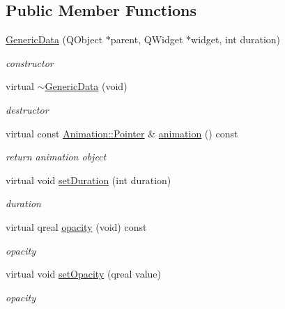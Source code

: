 \subsection*{Public Member Functions}
\begin{DoxyCompactItemize}
\item 
\mbox{\label{class_generic_data_a94a05514f028618f282140d90edb54a9}} 
\hyperlink{class_generic_data_a94a05514f028618f282140d90edb54a9}{Generic\+Data} (Q\+Object $\ast$parent, Q\+Widget $\ast$widget, int duration)
\begin{DoxyCompactList}\small\item\em constructor \end{DoxyCompactList}\item 
\mbox{\label{class_generic_data_ad2a2f3e28578297cf74c7b87959e97ef}} 
virtual \hyperlink{class_generic_data_ad2a2f3e28578297cf74c7b87959e97ef}{$\sim$\+Generic\+Data} (void)
\begin{DoxyCompactList}\small\item\em destructor \end{DoxyCompactList}\item 
\mbox{\label{class_generic_data_a0fd3c046efc8d0d3fccb918e6335157d}} 
virtual const \hyperlink{class_animation_ac48a8d074abd43dc3f6485353ba24e30}{Animation\+::\+Pointer} \& \hyperlink{class_generic_data_a0fd3c046efc8d0d3fccb918e6335157d}{animation} () const
\begin{DoxyCompactList}\small\item\em return animation object \end{DoxyCompactList}\item 
\mbox{\label{class_generic_data_ac2802c418de5b3731acb96da7127f4c5}} 
virtual void \hyperlink{class_generic_data_ac2802c418de5b3731acb96da7127f4c5}{set\+Duration} (int duration)
\begin{DoxyCompactList}\small\item\em duration \end{DoxyCompactList}\item 
\mbox{\label{class_generic_data_a777086aae416e8c8be20ea5c1226dbd0}} 
virtual qreal \hyperlink{class_generic_data_a777086aae416e8c8be20ea5c1226dbd0}{opacity} (void) const
\begin{DoxyCompactList}\small\item\em opacity \end{DoxyCompactList}\item 
\mbox{\label{class_generic_data_a04ba9ff11a7774b3c97d66d1f8cf170d}} 
virtual void \hyperlink{class_generic_data_a04ba9ff11a7774b3c97d66d1f8cf170d}{set\+Opacity} (qreal value)
\begin{DoxyCompactList}\small\item\em opacity \end{DoxyCompactList}\end{DoxyCompactItemize}
